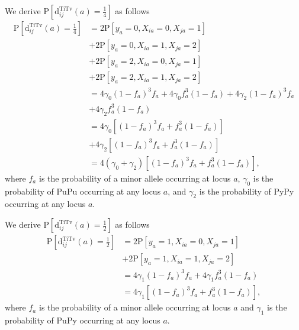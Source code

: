 \documentclass[aos]{imsart}
\begin{document}
We derive $\text{P}\left[\text{d}^\text{TiTv}_{ij}(a) = \frac{1}{4}\right]$ as follows
%
\begin{equation}\label{eq:prob_TiTv_0.25}
\begin{aligned}
\text{P}\left[\text{d}^\text{TiTv}_{ij}(a) = \frac{1}{4}\right] &= 2 \text{P}\left[y_a = 0, X_{ia} = 0, X_{ja} = 1\right] \\
&+ 2 \text{P}\left[y_a = 0, X_{ia} = 1, X_{ja} = 2\right] \\
&+ 2 \text{P}\left[y_a = 2, X_{ia} = 0, X_{ja} = 1\right] \\
&+ 2 \text{P}\left[y_a = 2, X_{ia} = 1, X_{ja} = 2\right] \\
&= 4 \gamma_0 (1 - f_a)^3 f_a + 4 \gamma_0 f^3_a (1 - f_a) + 4 \gamma_2 (1 - f_a)^3 f_a \\
&+ 4 \gamma_2 f^3_a (1 - f_a) \\
&= 4 \gamma_0 \left[(1 - f_a)^3 f_a + f^3_a (1 - f_a)\right] \\
&+ 4 \gamma_2 \left[(1 - f_a)^3 f_a + f^3_a (1 - f_a)\right] \\
&= 4(\gamma_0 + \gamma_2)\left[(1 - f_a)^3 f_a + f^3_a (1 - f_a)\right],
\end{aligned}
\end{equation}
%
where $f_a$ is the probability of a minor allele occurring at locus $a$, $\gamma_0$ is the probability of PuPu occurring at any locus $a$,  and $\gamma_2$ is the probability of PyPy occurring at any locus $a$.

We derive $\text{P}\left[\text{d}^\text{TiTv}_{ij}(a) = \frac{1}{2}\right]$ as follows
%
\begin{equation}\label{eq:prob_TiTv_0.5}
\begin{aligned}
\text{P}\left[\text{d}^\text{TiTv}_{ij}(a) = \frac{1}{2}\right] &= 2 \text{P}\left[y_a = 1, X_{ia} = 0, X_{ja} = 1\right] \\
&+ 2 \text{P}\left[y_a = 1, X_{ia} = 1, X_{ja} = 2\right] \\
&= 4 \gamma_1 (1 - f_a)^3 f_a + 4 \gamma_1 f^3_a (1 - f_a) \\
&= 4 \gamma_1 \left[(1 - f_a)^3 f_a + f^3_a (1 - f_a)\right],
\end{aligned}
\end{equation}
%
where $f_a$ is the probability of a minor allele occurring at locus $a$ and $\gamma_1$ is the probability of PuPy occurring at any locus $a$.
\end{document}
